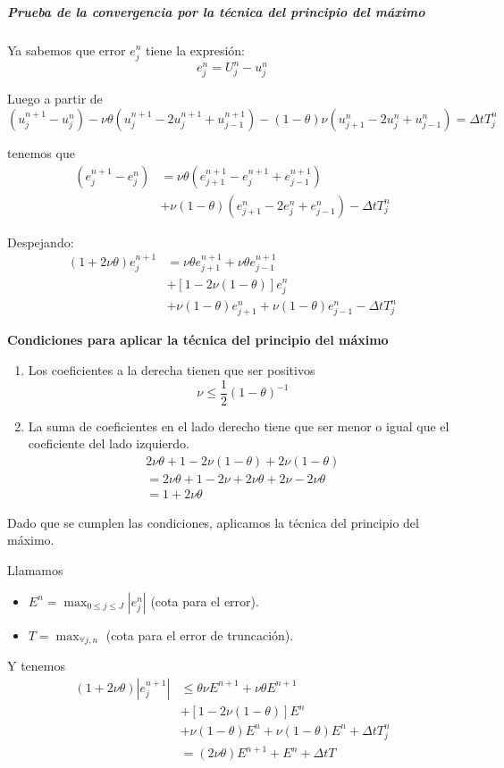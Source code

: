 \subparagraph{Prueba de la convergencia por la técnica del principio del máximo}\mbox{}

Ya sabemos que error $e_j^n$ tiene la expresión:
$$e_j^n = U_j^n-u_j^n$$

Luego a partir de
$$(u_j^{n+1}-u_j^n)-\nu\theta(u_{j}^{n+1}-2u_{j}^{n+1}+u_{j-1}^{n+1}) - (1-\theta)\nu(u_{j+1}^{n}-2u_{j}^{n}+u_{j-1}^{n}) = \Delta t T_j^n$$

tenemos que
\begin{align*}
(e_{j}^{n+1}-e_{j}^{n}) & = \nu\theta(e_{j+1}^{n+1}-e_{j}^{n+1}+e_{j-1}^{n+1})\\
& + \nu(1-\theta)(e_{j+1}^{n}-2e_{j}^{n}+e_{j-1}^{n}) - \Delta tT_j^n
\end{align*}

Despejando:
\begin{align*}
	(1+2\nu\theta)e_j^{n+1} & = \nu\theta e_{j+1}^{n+1} + \nu\theta e_{j-1}^{n+1}\\
	& +\left[1 - 2\nu(1-\theta)\right] e_{j}^{n}\\
	& +\nu(1-\theta)e_{j+1}^{n} + \nu (1-\theta)e_{j-1}^{n} - \Delta t T_j^n
\end{align*}

\textbf{Condiciones para aplicar la técnica del principio del máximo}
\begin{enumerate}
	\item Los coeficientes a la derecha tienen que ser positivos
			$$\nu \le \frac{1}{2}(1-\theta)^{-1}$$
	\item La suma de coeficientes en el lado derecho tiene que ser menor o igual que el coeficiente del lado izquierdo.
	\begin{align*}
		2\nu\theta + 1 - 2\nu(1-\theta) + 2\nu(1-\theta)\\
		= 2\nu\theta + 1 - 2\nu + 2\nu\theta + 2\nu -2\nu\theta\\
		= 1+2\nu\theta
	\end{align*}
\end{enumerate}

Dado que se cumplen las condiciones, aplicamos la técnica del principio del máximo. 

Llamamos
\begin{itemize}
	\item $E^n= \max_{0\le j\le J}|e_j^n|$ (cota para el error).
	\item $T = \max_{\forall j, n}$ (cota para el error de truncación).
\end{itemize}

Y tenemos
\begin{align*}
	(1+2\nu\theta)|e_j^{n+1}| & \le \theta\nu E^{n+1} + \nu\theta E^{n+1}\\
	& +\left[1 - 2\nu(1-\theta)\right] E^{n}\\
	& +\nu(1-\theta)E^{n} + \nu (1-\theta)E^{n} + \Delta t T_j^n\\
	& = (2\nu\theta)E^{n+1}+E^n+\Delta t T
\end{align*}

